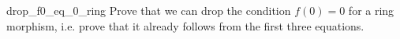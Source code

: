 \begin{cex}{}{drop_f0_eq_0_ring}
    Prove that we can drop the condition \( f(0) = 0 \) for a ring morphism, i.e. prove that it already follows from the first three equations.
\end{cex}

